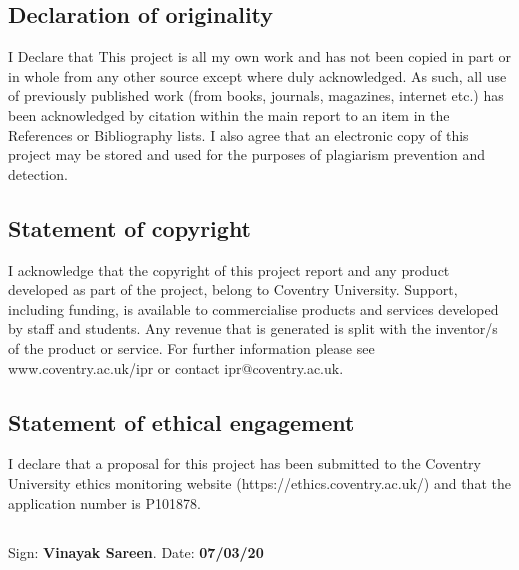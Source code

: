 \subsection*{Declaration of originality}
I Declare that This project is all my own work and has not been copied in part or in whole from any other source except where duly acknowledged.  As such, all use of previously published work (from books, journals, magazines, internet etc.) has been acknowledged by citation within the main report to an item in the References or Bibliography lists. I also agree that an electronic copy of this project may be stored and used for the purposes of plagiarism prevention and detection.
\subsection*{Statement of copyright}
I acknowledge that the copyright of this project report and any product developed as part of the project, belong to Coventry University. 
Support, including funding, is available to commercialise products and services developed by staff and students. 
 Any revenue that is generated is split with the inventor/s of the product or service. 
For further information please see www.coventry.ac.uk/ipr or contact ipr@coventry.ac.uk.
\subsection*{Statement of ethical engagement}

I declare that a proposal for this project has been submitted to the Coventry University ethics monitoring website (https://ethics.coventry.ac.uk/) and that the application number is P101878.
\subsection*{}
Sign: \textbf{Vinayak Sareen}. \hspace{20mm}  Date:  \textbf{07/03/20}

